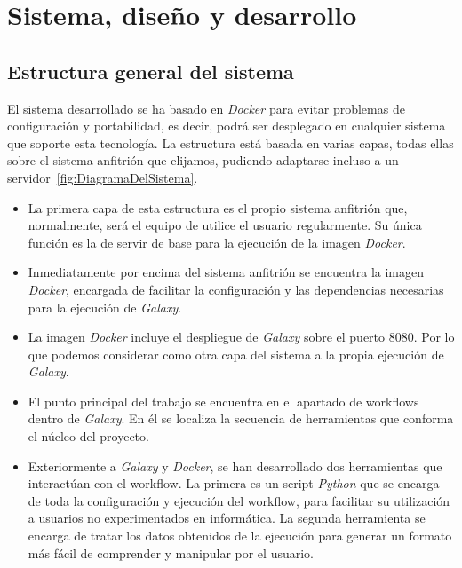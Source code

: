 \chapter{Sistema, diseño y desarrollo}
\label{chap:sistemadesarrollado}

\section{Estructura general del sistema}

El sistema desarrollado se ha basado en \textit{Docker} para evitar problemas de configuración y portabilidad, es decir, podrá ser desplegado en cualquier sistema que soporte esta tecnología. La estructura está basada en varias capas, todas ellas sobre el sistema anfitrión que elijamos, pudiendo adaptarse incluso a un servidor~\ref{fig:DiagramaDelSistema}. 

\begin{itemize}
\item La primera capa de esta estructura es el propio sistema anfitrión que, normalmente, será el equipo de utilice el usuario regularmente. Su única función es la de servir de base para la ejecución de la imagen {\itshape{Docker}}.
\item Inmediatamente por encima del sistema anfitrión se encuentra la imagen {\itshape{Docker}}, encargada de facilitar la configuración y las dependencias necesarias para la ejecución de {\itshape{Galaxy}}.
\item La imagen {\itshape{Docker}} incluye el despliegue de {\itshape{Galaxy}} sobre el puerto 8080. Por lo que podemos considerar como otra capa del sistema a la propia ejecución de {\itshape{Galaxy}}.
\item El punto principal del trabajo se encuentra en el apartado de workflows dentro de {\itshape{Galaxy}}. En él se localiza la secuencia de herramientas que conforma el núcleo del proyecto.
\item Exteriormente a {\itshape{Galaxy}} y {\itshape{Docker}}, se han desarrollado dos herramientas que interactúan con el workflow. La primera es un script {\itshape{Python}} que se encarga de toda la configuración y ejecución del workflow, para facilitar su utilización a usuarios no experimentados en informática. La segunda herramienta se encarga de tratar los datos obtenidos de la ejecución para generar un formato más fácil de comprender y manipular por el usuario.
\end{itemize}

